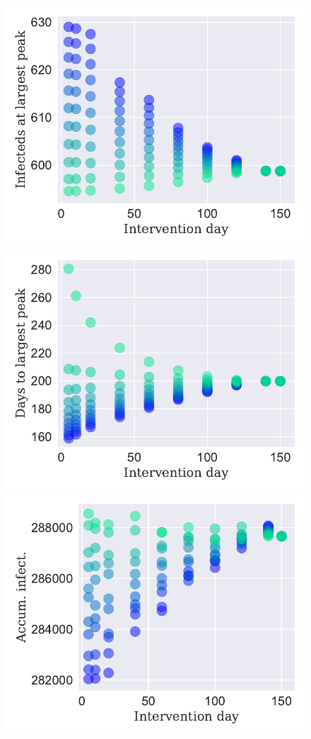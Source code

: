 \documentclass[11pt]{article}
\begin{document}
\begin{figure}[ht]
\centering
\includegraphics[scale=.32]{./intervention_summary_A}
\includegraphics[scale=.32]{./intervention_summary_B}
\includegraphics[scale=.32]{./intervention_summary_C}

\end{figure}
\end{document}
